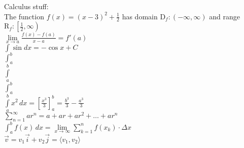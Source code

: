 \documentclass{article}
\begin{document}
  Calculus stuff:\\
  The function \(f(x)=(x-3)^2+\frac{1}{2}\) has domain \(\mathrm{D}_{f}:(-\infty,\infty)\) and range \({\mathrm{R}_{f}:\left[\frac{1}{2},\infty\right)}\)\\
  
  \(\lim\limits_{x \to a} \frac{f(x)-f(a)}{x-a}=f'(a)\)\\
  
  \(\int{\sin{}dx}=-\cos{x}+C\)\\
  \(\int_{a}^{b}\)\\
  \(\int\limits_{a}^{b}\)\\
  \(\displaystyle{\int_{a}^{b}}\)\\
  \(\displaystyle{\int\limits_{a}^{b}}x^{2}\,dx=\left[\frac{x^{3}}{3}\right]_{a}^{b}=\frac{b^{3}}{3}-\frac{a^{3}}{3}\)\\
  \(\displaystyle{\sum \limits_{n=1}^{\infty}ar^{n}=a+ar+ar^{2}+\ldots+ar^{n}}\) \\
  \(\displaystyle{\int_{a}^{b} f(x) \,dx=\lim\limits_{x \to \infty} \sum \limits_{k=1}^{n}f(x_{k})\cdot \Delta x}\)\\
  \(\vec{v}=v_{1} \vec{i}+v_{2}\vec{j}=\langle v_1, v_2\rangle\)
\end{document}
